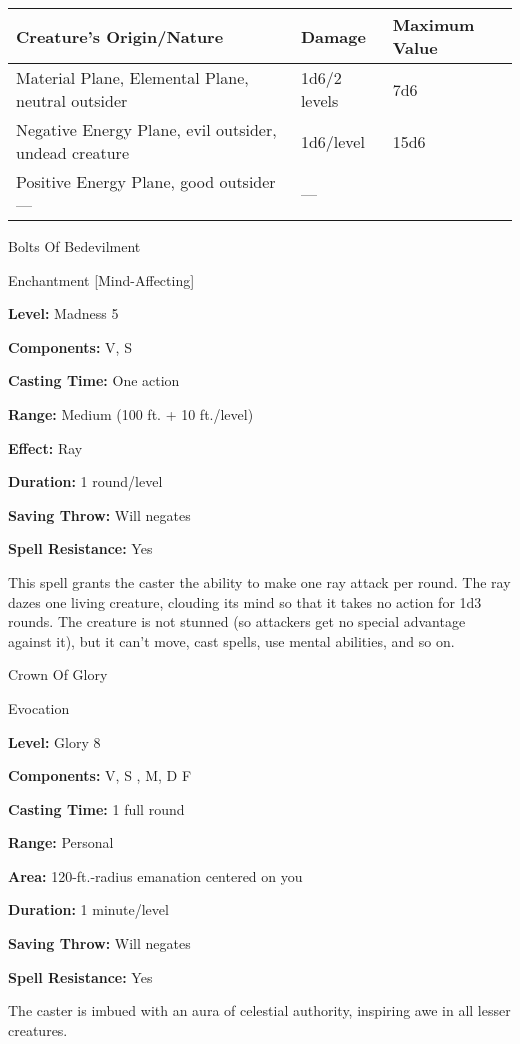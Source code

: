 \documentclass{article}
\begin{document}
\begin{tabular}{|>{\raggedright}p{197pt}|>{\raggedright}p{47pt}|>{\raggedright}p{68pt}|}
\hline
C\textbf{reature's Origin/Nature} & D\textbf{amage} & M\textbf{aximum Value}\tabularnewline
\hline
Material Plane, Elemental Plane, neutral outsider & 1d6/2 levels & 7d6\tabularnewline
\hline
Negative Energy Plane, evil outsider, undead creature & 1d6/level & 15d6\tabularnewline
\hline
Positive Energy Plane, good outsider--- & --- & \tabularnewline
\hline
\end{tabular}

\vspace{12pt}
Bolts Of Bedevilment

Enchantment [Mind-Affecting]

\textbf{Level:} Madness 5

\textbf{Components:} V, S

\textbf{Casting Time:} One action

\textbf{Range:} Medium (100 ft. + 10 ft./level)

\textbf{Effect:} Ray

\textbf{Duration:} 1 round/level

\textbf{Saving Throw:} Will negates

\textbf{Spell Resistance:} Yes

This spell grants the caster the ability to make one ray attack per round. The 
ray dazes one living creature, clouding its mind so that it takes no action for 
1d3 rounds. The creature is not stunned (so attackers get no special advantage 
against it), but it can't move, cast spells, use mental abilities, and so on.

\vspace{12pt}
Crown Of Glory

Evocation

\textbf{Level:} Glory 8

\textbf{Components:} V, S , M, D F

\textbf{Casting Time:} 1 full round

\textbf{Range:} Personal

\textbf{Area:} 120-ft.-radius emanation centered on you

\textbf{Duration:} 1 minute/level

\textbf{Saving Throw:} Will negates

\textbf{Spell Resistance:} Yes

The caster is imbued with an aura of celestial authority, inspiring awe in all 
lesser creatures.
\end{document}
